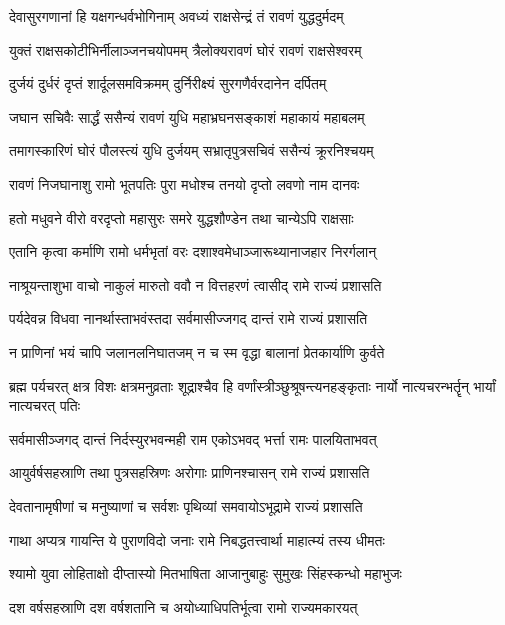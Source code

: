 \twolineshloka
{देवासुरगणानां हि यक्षगन्धर्वभोगिनाम्}
{अवध्यं राक्षसेन्द्रं तं रावणं युद्धदुर्मदम्}%

\twolineshloka
{युक्तं राक्षसकोटीभिर्नीलाञ्जनचयोपमम्}
{त्रैलोक्यरावणं घोरं रावणं राक्षसेश्वरम्}%

\twolineshloka
{दुर्जयं दुर्धरं दृप्तं शार्दूलसमविक्रमम्}
{दुर्निरीक्ष्यं सुरगणैर्वरदानेन दर्पितम्}%

\twolineshloka
{जघान सचिवैः सार्द्धं ससैन्यं रावणं युधि}
{महाभ्रघनसङ्काशं महाकायं महाबलम्}%

\twolineshloka
{तमागस्कारिणं घोरं पौलस्त्यं युधि दुर्जयम्}
{सभ्रातृपुत्रसचिवं ससैन्यं क्रूरनिश्चयम्}%

\twolineshloka
{रावणं निजघानाशु रामो भूतपतिः पुरा}
{मधोश्च तनयो दृप्तो लवणो नाम दानवः}%

\twolineshloka
{हतो मधुवने वीरो वरदृप्तो महासुरः}
{समरे युद्धशौण्डेन तथा चान्येऽपि राक्षसाः}%

\twolineshloka
{एतानि कृत्वा कर्माणि रामो धर्मभृतां वरः}
{दशाश्वमेधाञ्जारूथ्यानाजहार निरर्गलान्}%

\twolineshloka
{नाश्रूयन्ताशुभा वाचो नाकुलं मारुतो ववौ}
{न वित्तहरणं त्वासीद् रामे राज्यं प्रशासति}%

\twolineshloka
{पर्यदेवन्न विधवा नानर्थास्ताभवंस्तदा}
{सर्वमासीज्जगद् दान्तं रामे राज्यं प्रशासति}%

\twolineshloka
{न प्राणिनां भयं चापि जलानलनिघातजम्}
{न च स्म वृद्धा बालानां प्रेतकार्याणि कुर्वते}%


\threelineshloka
{ब्रह्म पर्यचरत् क्षत्र विशः क्षत्रमनुव्रताः}
{शूद्राश्चैव हि वर्णांस्त्रीञ्छुश्रूषन्त्यनहङ्कृताः}
{नार्यो नात्यचरन्भर्तॄन् भार्यां नात्यचरत् पतिः}%

\twolineshloka
{सर्वमासीञ्जगद् दान्तं निर्दस्युरभवन्मही}
{राम एकोऽभवद् भर्त्ता रामः पालयिताभवत्}%

\twolineshloka
{आयुर्वर्षसहस्राणि तथा पुत्रसहस्रिणः}
{अरोगाः प्राणिनश्चासन् रामे राज्यं प्रशासति}%

\twolineshloka
{देवतानामृषीणां च मनुष्याणां च सर्वशः}
{पृथिव्यां समवायोऽभूद्रामे राज्यं प्रशासति}%

\twolineshloka
{गाथा अप्यत्र गायन्ति ये पुराणविदो जनाः}
{रामे निबद्धतत्त्वार्था माहात्म्यं तस्य धीमतः}%

\twolineshloka
{श्यामो युवा लोहिताक्षो दीप्तास्यो मितभाषिता}
{आजानुबाहुः सुमुखः सिंहस्कन्धो महाभुजः}%

\twolineshloka
{दश वर्षसहस्राणि दश वर्षशतानि च}
{अयोध्याधिपतिर्भूत्वा रामो राज्यमकारयत्}%

